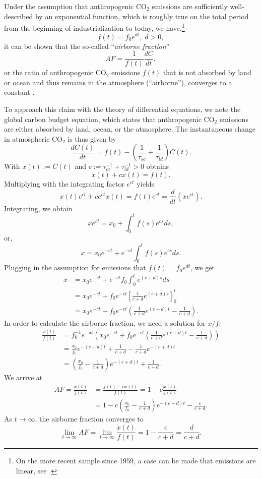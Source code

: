 \documentclass[10pt]{article}
\begin{document}
Under the assumption that anthropogenic CO$_2$ emissions are sufficiently well-described by an exponential function, which is roughly true on the total period from the beginning of industrialization to today, we have,\footnote{On the more recent sample since 1959, a case can be made that emissions are linear, see \cite{Bennedsen2023a}.}
\[
f(t) = f_0 e^{dt}, \; d>0,
\]
it can be shown that the so-called ``\textit{airborne fraction}'' 
\[
AF = \frac{1}{f(t)}\frac{dC}{dt},
\]
or the ratio of anthropogenic CO$_2$ emissions $f(t)$ that is not absorbed by land or ocean and thus remains in the atmosphere (``airborne''), converges to a constant \citep{Bennedsen2019,Bennedsen2023b,Bennedsen2024}.

To approach this claim with the theory of differential equations, we note the global carbon budget equation, which states that anthropogenic CO$_2$ emissions are either absorbed by land, ocean, or the atmosphere. The instantaneous change in atmospheric CO$_2$ is thus given by 
\[
\frac{d C(t)}{dt} = f(t) - \left(\frac{1}{\tau_{oc}} + \frac{1}{\tau_{ld}}\right) C(t).
\]
With $x(t):= C(t)$ and $c:=\tau_{oc}^{-1}+\tau_{ld}^{-1}>0$ obtains
\[
\dot x(t) + c x(t) = f(t).
\]
Multiplying with the integrating factor $e^{ct}$ yields
\[
\dot x(t) e^{ct} + c e^{ct} x(t) = f(t) e^{ct} = \frac{d}{dt} (xe^{ct}).
\]
Integrating, we obtain
\[
xe^{ct} = x_0 + \int_0^t f(s) e^{cs} ds,
\]
or,
\[
x = x_0 e^{-ct} + e^{-ct}\int_0^t f(s) e^{cs} ds.
\]
Plugging in the assumption for emissions that $f(t) = f_0 e^{dt}$, we get
\begin{align*}
x &= x_0 e^{-ct} + e^{-ct}f_0\int_0^t e^{(c+d)s} ds \\
 &= x_0 e^{-ct} + f_0 e^{-ct} \left[ \frac{1}{c+d} e^{(c+d)s} \right]_0^t \\
 &= x_0 e^{-ct} + f_0 e^{-ct} \left( \frac{1}{c+d} e^{(c+d)t} -  \frac{1}{c+d}\right).
\end{align*}
In order to calculate the airborne fraction, we need a solution for $x/f$:
\begin{align*}
\frac{x(t)}{f(t)} &= f_0^{-1} e^{-dt} \left(x_0 e^{-ct} + f_0 e^{-ct} \left( \frac{1}{c+d} e^{(c+d)t} -  \frac{1}{c+d}\right)\right) \\
 &= \frac{x_0}{f_0} e^{-(c+d)t} + \frac{1}{c+d} - \frac{1}{c+d} e^{-(c+d)t} \\
 &= \left(\frac{x_0}{f_0} - \frac{1}{c+d}\right)e^{-(c+d)t} + \frac{1}{c+d}.
\end{align*}
We arrive at
\begin{align*}
AF=\frac{\dot x(t)}{f(t)} &= \frac{f(t) - c x(t)}{f(t)} = 1 - c \frac{x(t)}{f(t)}\\
 &= 1 - c \left(\frac{x_0}{f_0} - \frac{1}{c+d}\right)e^{-(c+d)t} -  \frac{c}{c+d}.
\end{align*}
As $t\to\infty$, the airborne fraction converges to
\[
\lim_{t\to\infty} AF= \lim_{t\to\infty}\frac{\dot x(t)}{f(t)} = 1-\frac{c}{c+d} = \frac{d}{c+d}.
\]
\end{document}

